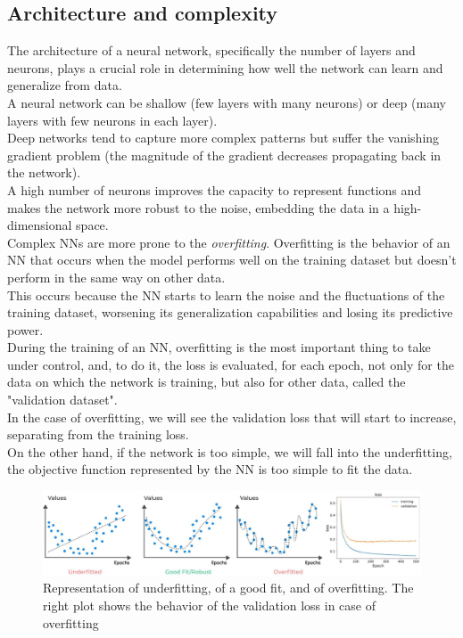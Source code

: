 \subsection{Architecture and complexity}
The architecture of a neural network, specifically the number of layers and neurons, plays a crucial role in determining how well the network can learn and generalize from data.\\
A neural network can be shallow (few layers with many neurons) or deep (many layers with few neurons in each layer). \\
Deep networks tend to capture more complex patterns but suffer the vanishing gradient problem (the magnitude of the gradient decreases propagating back in the network).\\
A high number of neurons improves the capacity to represent functions and makes the network more robust to the noise, embedding the data in a high-dimensional space.\\
Complex NNs are more prone to the \textit{overfitting}.
Overfitting is the behavior of an NN that occurs when the model performs well on the training dataset but doesn't perform in the same way on other data.\\
This occurs because the NN starts to learn the noise and the fluctuations of the training dataset, worsening its generalization capabilities and losing its predictive power.\\
During the training of an NN, overfitting is the most important thing to take under control, and, to do it, the loss is evaluated, for each epoch, not only for the data on which the network is training, but also for other data, called the "validation dataset".
\\
In the case of overfitting, we will see the validation loss that will start to increase, separating from the training loss.\\
On the other hand, if the network is too simple, we will fall into the underfitting, \ie the objective function represented by the NN is too simple to fit the data.
\vspace{-0.15cm}
\begin{figure}[H]
    \centering
    \includegraphics[width=1\linewidth]{fig/chap05-stats/overfit.jpg}
    \caption{Representation of underfitting, of a good fit, and of overfitting. The right plot shows the behavior of the validation loss in case of overfitting}
    \label{fig:overfitting}
\end{figure}
